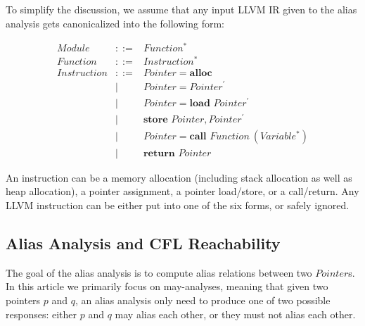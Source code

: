 \documentclass[10pt]{article}
\begin{document}
To simplify the discussion, we assume that any input LLVM IR given to the alias
analysis gets canonicalized into the following form:

\begin{eqnarray*}
  Module & ::= & Function^{*} \\
  Function & ::= & Instruction^{*} \\
  Instruction & ::= & Pointer = \textbf{alloc} \\
              & | & Pointer = Pointer^\prime \\
              & | & Pointer = \textbf{load } Pointer^\prime \\
              & | & \textbf{store } Pointer, Pointer^\prime \\
              & | & Pointer = \textbf{call } Function\ (Variable^{*}) \\
              & | & \textbf{return } Pointer
\end{eqnarray*}

An instruction can be a memory allocation (including stack allocation as well as
heap allocation), a pointer assignment, a pointer load/store, or a call/return.
Any LLVM instruction can be either put into one of the six forms, or safely ignored.

\subsection{Alias Analysis and CFL Reachability}\label{cflintro}

The goal of the alias analysis is to compute alias relations between two
$Pointer$s. In this article we primarily focus on may-analyses, meaning that given two pointers
$p$ and $q$, an alias analysis only need to produce one of two possible responses: either $p$ and
$q$ may alias each other, or they must not alias each other.
\end{document}

